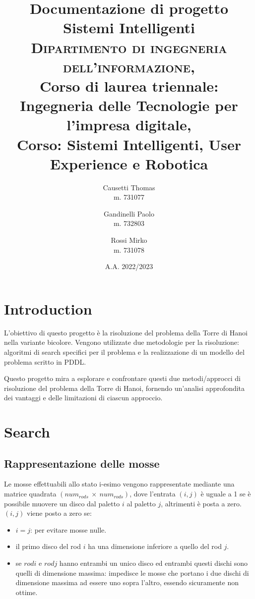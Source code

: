 \documentclass{article}
\title{\textbf{Documentazione di progetto Sistemi Intelligenti}\\
\vspace{5mm}
\large \textsc{Dipartimento di ingegneria dell'informazione,} \\
Corso di laurea triennale: Ingegneria delle Tecnologie per l'impresa digitale, \\
Corso: Sistemi Intelligenti, User Experience e Robotica\\}
\date{A.A. 2022/2023}
\author{Causetti Thomas\\ m. 731077 \and Gandinelli Paolo\\ m. 732803 \and Rossi Mirko\\ m. 731078}
\begin{document}
\maketitle


\section*{Introduction}

L'obiettivo di questo progetto è la risoluzione del problema della Torre di Hanoi nella variante bicolore. Vengono utilizzate due metodologie per la risoluzione: algoritmi di search specifici per il problema e la realizzazione di un modello del problema scritto in PDDL.

Questo progetto mira a esplorare e confrontare questi due metodi/approcci di risoluzione del problema della Torre di Hanoi, fornendo un'analisi approfondita dei vantaggi e delle limitazioni di ciascun approccio.

\section{Search}

\subsection{Rappresentazione delle mosse}

Le mosse effettuabili allo stato i-esimo vengono rappresentate mediante una matrice quadrata $(num_{rods}\ \times \ num_{rods})$,  dove l'entrata $(i,j)$ è uguale a 1 se è possibile muovere un disco dal paletto $i$ al paletto $j$, altrimenti è posta a zero. $(i,j)$ viene posto a zero se:
\begin{itemize}
    \item $i = j$: per evitare mosse nulle.
    \item il primo disco del rod $i$ ha una dimensione inferiore a quello del rod $j$.
    \item se $rodi$ e $rodj$ hanno entrambi un unico disco ed entrambi questi dischi sono quelli di dimensione massima: impedisce le mosse che portano i due dischi di dimensione massima ad essere uno sopra l'altro, essendo sicuramente non ottime.
\end{itemize}
\end{document}

